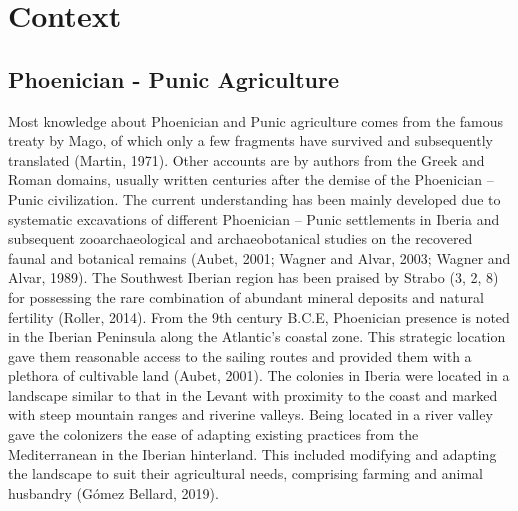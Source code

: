\documentclass[3p]{elsarticle} %
\begin{document}
\hypertarget{context}{%
\section{Context}\label{context}}

\hypertarget{phoenician---punic-agriculture}{%
\subsection{Phoenician - Punic Agriculture}\label{phoenician---punic-agriculture}}

Most knowledge about Phoenician and Punic agriculture comes from the famous treaty by Mago, of which only a few fragments have survived and subsequently translated (Martin, 1971). Other accounts are by authors from the Greek and Roman domains, usually written centuries after the demise of the Phoenician -- Punic civilization. The current understanding has been mainly developed due to systematic excavations of different Phoenician -- Punic settlements in Iberia and subsequent zooarchaeological and archaeobotanical studies on the recovered faunal and botanical remains (Aubet, 2001; Wagner and Alvar, 2003; Wagner and Alvar, 1989).
The Southwest Iberian region has been praised by Strabo (3, 2, 8) for possessing the rare combination of abundant mineral deposits and natural fertility (Roller, 2014). From the 9th century B.C.E, Phoenician presence is noted in the Iberian Peninsula along the Atlantic's coastal zone. This strategic location gave them reasonable access to the sailing routes and provided them with a plethora of cultivable land (Aubet, 2001). The colonies in Iberia were located in a landscape similar to that in the Levant with proximity to the coast and marked with steep mountain ranges and riverine valleys. Being located in a river valley gave the colonizers the ease of adapting existing practices from the Mediterranean in the Iberian hinterland. This included modifying and adapting the landscape to suit their agricultural needs, comprising farming and animal husbandry (Gómez Bellard, 2019).
\end{document}
